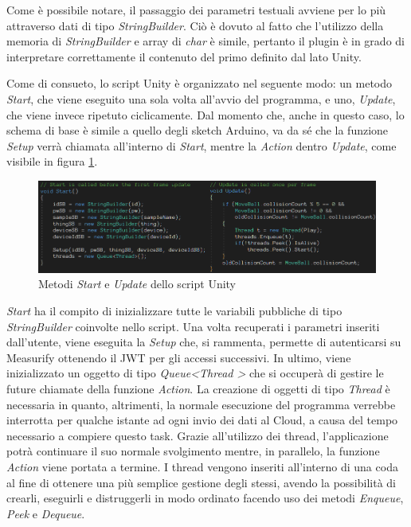 Come è possibile notare, il passaggio dei parametri testuali avviene per lo più attraverso dati di tipo \textit{StringBuilder}. Ciò è dovuto al fatto che l’utilizzo della memoria di \textit{StringBuilder} e array di \textit{char} è simile, pertanto il plugin è in grado di interpretare correttamente il contenuto del primo definito dal lato Unity. 

Come di consueto, lo script Unity è organizzato nel seguente modo: un metodo \textit{Start}, che viene eseguito una sola volta all’avvio del programma, e uno, \textit{Update}, che viene invece ripetuto ciclicamente. Dal momento che, anche in questo caso, lo schema di base è simile a quello degli sketch Arduino, va da sé che la funzione \textit{Setup} verrà chiamata all'interno di \textit{Start}, mentre la \textit{Action} dentro \textit{Update}, come visibile in figura \ref{startupdate}. 

\begin{figure}[H]
	\centering
	\includegraphics[width=\linewidth]{pics/startupdate}
	\caption{Metodi \textit{Start} e \textit{Update} dello script Unity}
	\label{startupdate}
\end{figure}

\textit{Start} ha il compito di inizializzare tutte le variabili pubbliche di tipo \textit{StringBuilder} coinvolte nello script. Una volta recuperati i parametri inseriti dall'utente, viene eseguita la \textit{Setup} che, si rammenta, permette di autenticarsi su Measurify ottenendo il JWT per gli accessi successivi. In ultimo, viene inizializzato un oggetto di tipo \textit{Queue\textless Thread \textgreater} che si occuperà di gestire le future chiamate della funzione \textit{Action}. La creazione di oggetti di tipo \textit{Thread} è necessaria in quanto, altrimenti, la normale esecuzione del programma verrebbe interrotta per qualche istante ad ogni invio dei dati al Cloud, a causa del tempo necessario a compiere questo task. Grazie all'utilizzo dei thread, l'applicazione potrà continuare il suo normale svolgimento mentre, in parallelo, la funzione \textit{Action} viene portata a termine. I thread vengono inseriti all'interno di una coda al fine di ottenere una più semplice gestione degli stessi, avendo la possibilità di crearli, eseguirli e distruggerli in modo ordinato facendo uso dei metodi \textit{Enqueue}, \textit{Peek} e \textit{Dequeue}.

